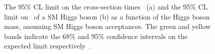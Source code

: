 \begin{figure}
  \begin{center}

 \caption{The 95\% \ac{CL} limit on the cross-section times \BRinv\, (a) and the 95\% \ac{CL} limit on \BRinv\, of a SM Higgs boson (b) as a function of the Higgs boson mass, assuming SM Higgs boson acceptances. The green and yellow bands indicate the 68\% and 95\% confidence intervals on the expected limit respectively~\cite{CMS-PAS-HIG-14-038}.}
    \label{fig:parkedlimits}
  \end{center}
\end{figure}

